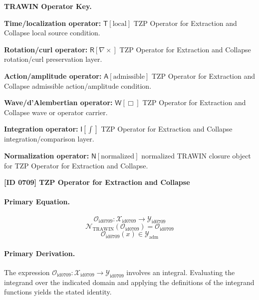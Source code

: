 \par\vspace{0.45\baselineskip}
\noindent\begin{minipage}[t]{\linewidth}
\begingroup
\small
\raggedright
\textbf{TRAWIN Operator Key.}\par
\noindent\textbf{Time/localization operator:} $\mathsf{T}\!\left[\mathrm{local}\right]$ TZP Operator for Extraction and Collapse local source condition.\par
\noindent\textbf{Rotation/curl operator:} $\mathsf{R}\!\left[\nabla\times\right]$ TZP Operator for Extraction and Collapse rotation/curl preservation layer.\par
\noindent\textbf{Action/amplitude operator:} $\mathsf{A}\!\left[\mathrm{admissible}\right]$ TZP Operator for Extraction and Collapse admissible action/amplitude condition.\par
\noindent\textbf{Wave/d'Alembertian operator:} $\mathsf{W}\!\left[\Box\right]$ TZP Operator for Extraction and Collapse wave or operator carrier.\par
\noindent\textbf{Integration operator:} $\mathsf{I}\!\left[\int\right]$ TZP Operator for Extraction and Collapse integration/comparison layer.\par
\noindent\textbf{Normalization operator:} $\mathsf{N}\!\left[\mathrm{normalized}\right]$ normalized TRAWIN closure object for TZP Operator for Extraction and Collapse.\par
\endgroup
\end{minipage}

\clearpage
\noindent\textbf{[ID 0709] TZP Operator for Extraction and Collapse}\par
\vspace{0.35em}
\paragraph{Primary Equation.}
\[
\mathcal{O}_{\mathrm{id0709}}:\mathcal{X}_{\mathrm{id0709}}\longrightarrow\mathcal{Y}_{\mathrm{id0709}}
\]
\[
\mathcal{N}_{\mathrm{TRAWIN}}(\mathcal{O}_{\mathrm{id0709}})=\mathcal{O}_{\mathrm{id0709}}
\]
\[
\mathcal{O}_{\mathrm{id0709}}(x)\in\mathcal{Y}_{\mathrm{adm}}
\]

\paragraph{Primary Derivation.}
The expression \( \mathcal{O}_{\mathrm{id0709}}:\mathcal{X}_{\mathrm{id0709}}\longrightarrow\mathcal{Y}_{\mathrm{id0709}} \) involves an integral. Evaluating the integrand over the indicated domain and applying the definitions of the integrand functions yields the stated identity.
